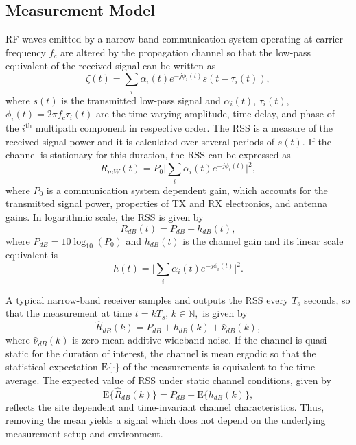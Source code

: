 \documentclass[journal, 10pt, twocolumn, balance]{IEEEtran}
\begin{document}
\subsection{Measurement Model}

RF waves emitted by a narrow-band communication system operating at carrier frequency $f_c$ are altered by the propagation channel so that the low-pass equivalent of the received signal \cite[Ch. 13]{Proakis2008} can be written as  
\begin{equation}\label{eq:received_signal}
	\zeta(t) = \sum_{i} \alpha_i(t) e^{-j\phi_i(t)}s(t-\tau_i(t)),
\end{equation}
where $s(t)$ is the transmitted low-pass signal and $\alpha_i(t)$, $\tau_i(t)$, $\phi_i(t)= 2 \pi f_c \tau_i(t)$ are the time-varying amplitude, time-delay, and phase of the $i^ \text{th}$ multipath component in respective order. The RSS is a measure of the received signal power and it is calculated over several periods of $s(t)$. If the channel is stationary for this duration, the RSS can be expressed as
\begin{equation}\label{eq:narrowband}
	R_{mW}(t) = P_0 \biggl| \sum_{i} \alpha_i(t) e^{-j\phi_i(t)}\biggr|^2,
\end{equation} 
where $P_0$ is a communication system dependent gain, which accounts for the transmitted signal power, properties of TX and RX electronics, and antenna gains. In logarithmic scale, the RSS is given by
\begin{equation}\label{eq:RSS_dB}
	R_{dB}(t) = P_{dB} + h_{dB}(t),
\end{equation}
where $P_{dB} = 10\log_{10}(P_0)$ and $h_{dB}(t)$ is the channel gain and its linear scale equivalent is
\begin{equation}\label{eq:channel}
	h(t) = \biggl|\sum_{i} \alpha_i(t) e^{-j\phi_i(t)}\biggr|^2.
\end{equation}


A typical narrow-band receiver samples and outputs the RSS every $T_s$ seconds, so that the measurement at time $t = k T_s$, $k \in \mathbb{N},$ is given by
\begin{equation}
	\hat{R}_{dB}(k) = P_{dB} + h_{dB}(k) + \hat{\nu}_{dB}(k),
\end{equation}
where $\hat{\nu}_{dB}(k)$ is zero-mean additive wideband noise. If the channel is quasi-static for the duration of interest, the channel is mean ergodic so that the statistical expectation $\mathrm{E}\{\cdot\}$ of the measurements is equivalent to the time average. The expected value of RSS under static channel conditions, given by
\begin{equation}
\mathrm{E}\{\hat{R}_{dB}(k)\}= P_{dB} + \mathrm{E}\{h_{dB}(k)\},
\end{equation}
reflects the site dependent and time-invariant channel characteristics. Thus, removing the mean yields a signal which does not depend on the underlying measurement setup and environment. 
\end{document}
